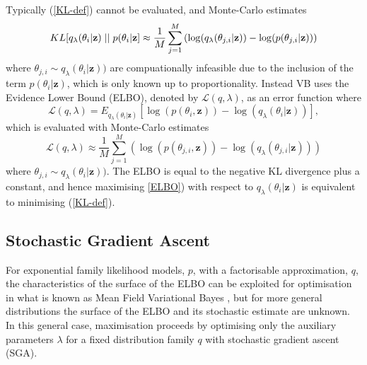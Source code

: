 \documentclass[12pt,a4paper]{article}\usepackage[]{graphicx}\usepackage[]{color}
\begin{document}
Typically (\ref{KL-def}) cannot be evaluated, and Monte-Carlo estimates
\begin{equation}
\label{KL-MC}
KL[q_{\lambda}(\theta_i | \textbf{z})\hspace{.1cm}||\hspace{.1cm}p(\theta_i | \textbf{z}] \approx \frac{1}{M}\sum_{j=1}^M \left(\log(q_{\lambda}(\theta_{j, i} | \textbf{z})) - \log(p(\theta_{j, i} | \textbf{z})) \right)
\end{equation}
where $\theta_{j, i} \sim q_{\lambda}(\theta_i | \textbf{z}))$ are compuationally infeasible due to the inclusion of the term $p(\theta_i | \textbf{z})$, which is only known up to proportionality. Instead VB uses the Evidence Lower Bound (ELBO), denoted by $\mathcal{L}(q, \lambda)$, as an error function where
\begin{equation}
\label{ELBO}
\mathcal{L}(q, \lambda) = E_{q_{\lambda}(\theta_i | \textbf{z})} \left[\log(p(\theta_i, \textbf{z})) - \log(q_{\lambda}(\theta_i | \textbf{z}))\right],
\end{equation}
which is evaluated with Monte-Carlo estimates
\begin{equation}
\label{ELBO-MC}
\mathcal{L}(q, \lambda) \approx \frac{1}{M} \sum_{j=1}^M \left(\log(p(\theta_{j, i}, \textbf{z})) - \log(q_{\lambda}(\theta_{j, i} | \textbf{z})) \right)
\end{equation}
where $\theta_{j, i} \sim q_{\lambda}(\theta_i | \textbf{z}))$. The ELBO is equal to the negative KL divergence plus a constant, and hence maximising \ref{ELBO}) with respect to $q_{\lambda}(\theta_i | \textbf{z})$ is equivalent to minimising (\ref{KL-def}).

\subsection{Stochastic Gradient Ascent}
\label{subsec:SGA}
For exponential family likelihood models, $p$, with a factorisable approximation, $q$, the characteristics of the surface of the ELBO can be exploited for optimisation in what is known as Mean Field Variational Bayes \citep{Jordan1999, Ghahramani2000, Wainwright2008}, but for more general distributions the surface of the ELBO and its stochastic estimate are unknown. In this general case, maximisation proceeds by optimising only the auxiliary parameters $\lambda$ for a fixed distribution family $q$ with stochastic gradient ascent (SGA).
\\
\end{document}
